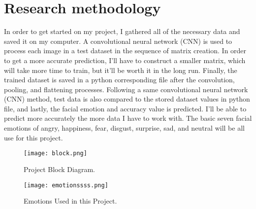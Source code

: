 \documentclass{ieeeaccess}
\begin{document}
\section{Research methodology}
In order to get started on my project, I gathered all of the necessary data and saved it on my computer. A convolutional neural network (CNN) is used to process each image in a test dataset in the sequence of matrix creation. In order to get a more accurate prediction, I'll have to construct a smaller matrix, which will take more time to train, but it'll be worth it in the long run. Finally, the trained dataset is saved in a python corresponding file after the convolution, pooling, and flattening processes.
Following a same convolutional neural network (CNN) method, test data is also compared to the stored dataset values in python file, and lastly, the facial emotion and accuracy value is predicted.
I'll be able to predict more accurately the more data I have to work with. The basic seven facial emotions of angry, happiness, fear, disgust, surprise, sad, and neutral will be all use for this project.
\begin{figure}[h]
\centering
\texttt{[image: block.png]}
\caption{Project Block Diagram.}
\end{figure}

\begin{figure}[h]
\centering
\texttt{[image: emotionssss.png]}
\caption{Emotions Used in this Project.}
\end{figure}
\end{document}
